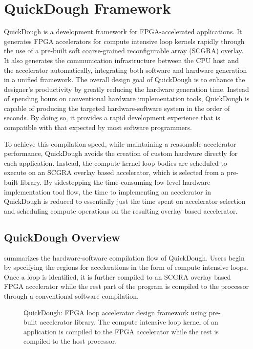 \section{QuickDough Framework}\label{sec:framework}
QuickDough is a development framework for FPGA-accelerated applications. It generates FPGA accelerators for compute intensive loop kernels rapidly through the use of a pre-built soft coarse-grained reconfigurable array (SCGRA) overlay. It also generates the communication infrastructure between the CPU host and the accelerator automatically, integrating both software and hardware generation in a unified framework. The overall design goal of QuickDough is to enhance the designer's productivity by greatly reducing the hardware generation time. Instead of spending hours on conventional hardware implementation tools, QuickDough is capable of producing the targeted hardware-software system in the order of seconds. By doing so, it provides a rapid development experience that is compatible with that expected by most software programmers.

To achieve this compilation speed, while maintaining a reasonable accelerator performance, QuickDough avoids the creation of custom hardware directly for each application. Instead, the compute kernel loop bodies are scheduled to execute on an SCGRA overlay based accelerator, which is selected from a pre-built library. By sidestepping the time-consuming low-level hardware implementation tool flow, the time to implementing an accelerator in QuickDough is reduced to essentially just the time spent on accelerator selection and scheduling compute operations on the resulting overlay based accelerator. 

\subsection{QuickDough Overview}
 summarizes the hardware-software compilation flow of QuickDough. Users begin by specifying the regions for accelerations in the form of compute intensive loops. Once a loop is identified, it is further compiled to an SCGRA overlay based FPGA accelerator while the rest part of the program is compiled to the processor through a conventional software compilation.

\begin{figure}[bt]
\vspace{-1em}
    \caption{QuickDough: FPGA loop accelerator design framework using pre-built accelerator library. 
        The compute intensive loop kernel of an application is compiled to the FPGA accelerator while the rest is compiled to the host processor.}
    \label{fig:framework}
\vspace{-1em}
\end{figure}

